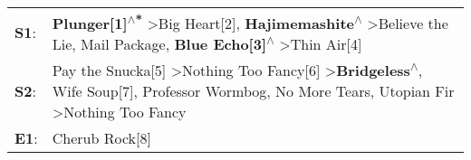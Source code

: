 \begin{supertabular}{p{0.03\textwidth}p{0.92\textwidth}}
 \textbf{S1}:  &                            \textbf{Plunger[1]\textsuperscript{$\wedge$*}} \textgreater \enspace Big Heart[2]\textsuperscript{}, \enspace \textbf{Hajimemashite\textsuperscript{$\wedge$}} \textgreater \enspace Believe the Lie\textsuperscript{}, \enspace Mail Package\textsuperscript{}, \enspace \textbf{Blue Echo[3]\textsuperscript{$\wedge$}} \textgreater \enspace Thin Air[4]\textsuperscript{}  \enspace  \\
 \textbf{S2}:  &  Pay the Snucka[5]\textsuperscript{} \textgreater \enspace Nothing Too Fancy[6]\textsuperscript{} \textgreater \enspace \textbf{Bridgeless\textsuperscript{$\wedge$}}, \enspace Wife Soup[7]\textsuperscript{}, \enspace Professor Wormbog\textsuperscript{}, \enspace No More Tears\textsuperscript{}, \enspace Utopian Fir\textsuperscript{} \textgreater \enspace Nothing Too Fancy\textsuperscript{}  \enspace  \\
 \textbf{E1}:  &                                                                                                                                                                                                                                                                                                                                                                         Cherub Rock[8]\textsuperscript{}  \enspace  \\
\end{supertabular}
